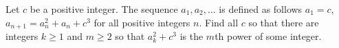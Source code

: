 Let $ c$ be a positive integer. The sequence $ a_1,a_2,\ldots$ is defined as follows $ a_1=c$, $ a_{n+1}=a_n^2+a_n+c^3$ for all positive integers $ n$. Find all $ c$ so that there are integers $ k\ge1$ and $ m\ge2$ so that $ a_k^2+c^3$ is the $ m$th power of some integer.